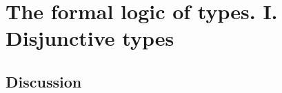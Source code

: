 
\chapter{The formal logic of types. I. Disjunctive types}

\section{Discussion}

\begin{comment}
 I will talk about disjunction types to introduce that topic I will
have to talk about these classes in Scala this is a feature of Scala
that is also present in most other programming languages but uninstaller
there cold case classes and this can be understood by recalling the
tuple so recall we have tuple types that look like this tuple types
such as this one represents a pair values or generally a certain fixed
set of values of different types possibly now in this notation there
are no names associated with these values or with this entire type
and for convenience we can define names both for the type and for
each of the values each of the parts of the tuple we can define a
name now this is convenient to remind ourselves what is the reason
we are introducing this tuple what are the meanings of each part so
here's an example we can say this is a name of the type my pair we
could say that and then we would do this but this doesn't give us
a lot because my pair would not be different from any other tuple
of int and string maybe with very different interpretation for example
here's a much better way of defining to polis names which in Scala
is called a case class but it's just a tuple with names we put a name
on the tuple itself and on each part so it's still quite the same
as a tuple of double and string but now it is not confused with they're
tuples of the balloon string so for example if I have in some other
part of my code I have a tuple of double and string it represents
the amount I paid and the name of the person I paid to and here it
represents my socks so if I did both of this with a tuple of double
and string then by mistake I could have mixed it up and instead of
using socks I would have used the amount paid which would be a total
disaster because it will in in the in the code that it looks just
like a tuple so we don't know where it came from and introducing this
type with these names helps to prevent this problem so once we wrote
this line this line here this defines a name for the entire tuple
type it defines a new type called my socks and it also defines names

\end{comment}
